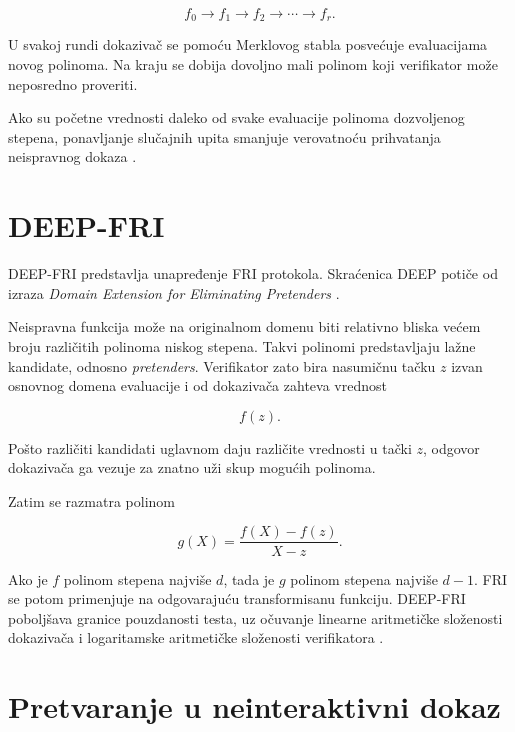 \begin{equation}
    f_0 \longrightarrow f_1 \longrightarrow f_2
    \longrightarrow \cdots \longrightarrow f_r.
\end{equation}

U svakoj rundi dokazivač se pomoću Merklovog stabla posvećuje evaluacijama
novog polinoma. Na kraju se dobija dovoljno mali polinom koji verifikator može
neposredno proveriti.

Ako su početne vrednosti daleko od svake evaluacije polinoma dozvoljenog
stepena, ponavljanje slučajnih upita smanjuje verovatnoću prihvatanja
neispravnog dokaza \cite{deepfri2020}.

\section{DEEP-FRI}

DEEP-FRI predstavlja unapređenje FRI protokola. Skraćenica DEEP potiče od
izraza \textit{Domain Extension for Eliminating Pretenders}
\cite{deepfri2020}.

Neispravna funkcija može na originalnom domenu biti relativno bliska većem
broju različitih polinoma niskog stepena. Takvi polinomi predstavljaju lažne
kandidate, odnosno \textit{pretenders}. Verifikator zato bira nasumičnu tačku
\(z\) izvan osnovnog domena evaluacije i od dokazivača zahteva vrednost

\begin{equation}
    f(z).
\end{equation}

Pošto različiti kandidati uglavnom daju različite vrednosti u tački \(z\),
odgovor dokazivača ga vezuje za znatno uži skup mogućih polinoma.

Zatim se razmatra polinom

\begin{equation}
    g(X) = \frac{f(X)-f(z)}{X-z}.
\end{equation}

Ako je \(f\) polinom stepena najviše \(d\), tada je \(g\) polinom stepena
najviše \(d-1\). FRI se potom primenjuje na odgovarajuću transformisanu funkciju.
DEEP-FRI poboljšava granice pouzdanosti testa, uz očuvanje linearne
aritmetičke složenosti dokazivača i logaritamske aritmetičke složenosti
verifikatora \cite{deepfri2020}.

\section{Pretvaranje u neinteraktivni dokaz}

